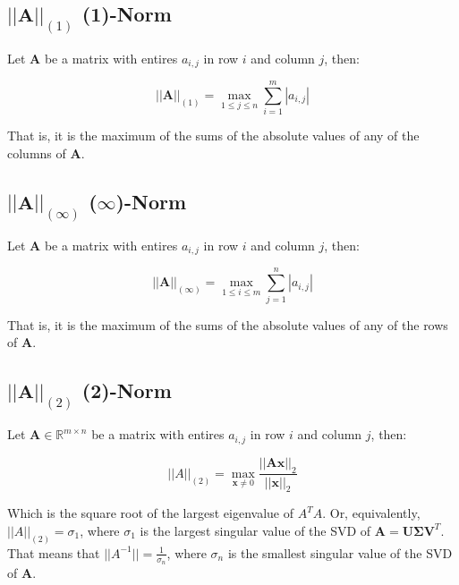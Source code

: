 \subsection{$||\mathbf{A}||_{(1)}$ (1)-Norm}
Let $\mathbf{A}$ be a matrix with entires $a_{i,j}$ in row $i$ and column $j$, then:

\begin{equation}
||\mathbf{A}||_{(1)} = \max_{1\leq j \leq n} \sum^m_{i=1} |a_{i,j} |
\end{equation}

That is, it is the maximum of the sums of the absolute values of any of the columns of $\mathbf{A}$.

\subsection{$||\mathbf{A}||_{(\infty)}$ ($\infty$)-Norm}

Let $\mathbf{A}$ be a matrix with entires $a_{i,j}$ in row $i$ and column $j$, then:

\begin{equation}
||\mathbf{A}||_{(\infty)} = \max_{1\leq i \leq m} \sum^n_{j=1} |a_{i,j} |
\end{equation}

That is, it is the maximum of the sums of the absolute values of any of the rows of $\mathbf{A}$.

\subsection{$||\mathbf{A}||_{(2)}$ (2)-Norm}
\label{2norm}

Let $\mathbf{A} \in \mathbb{R}^{m\times n}$ be a matrix with entires $a_{i,j}$ in row $i$ and column $j$, then:

\begin{equation}
||A||_{(2)} = \max_{\mathbf{x}\neq 0} \frac{||\mathbf{Ax}||_2}{||\mathbf{x}||_2}
\end{equation}

Which is the square root of the largest eigenvalue of $A^T A$. Or, equivalently, $||A||_{(2)} = \sigma_1$, where $\sigma_1$ is the largest singular value of the SVD of $\mathbf{A} = \mathbf{U\Sigma V}^T$. That means that $||A^{-1}|| = \frac{1}{\sigma_n}$, where $\sigma_n$ is the smallest singular value of the SVD of $\mathbf{A}$.




